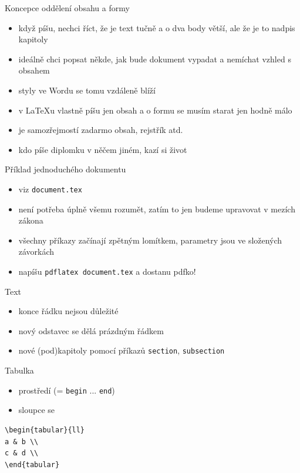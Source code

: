 \documentclass{beamer}
\begin{document}
\begin{frame}{Koncepce oddělení obsahu a formy}
  \begin{itemize}
    \item když píšu, nechci říct, že je text tučně a o dva body větší, ale že je to nadpis kapitoly
    \item ideálně chci popsat někde, jak bude dokument vypadat a nemíchat vzhled s obsahem
    \item styly ve Wordu se tomu vzdáleně blíží
    \item v LaTeXu vlastně píšu jen obsah a o formu se musím starat jen hodně málo
    \item je samozřejmostí zadarmo obsah, rejstřík atd.
    \item kdo píše diplomku v něčem jiném, kazí si život
  \end{itemize}
\end{frame}

\begin{frame}{Příklad jednoduchého dokumentu}
  \begin{itemize}
    \item viz \texttt{document.tex}
    \item není potřeba úplně všemu rozumět, zatím to jen budeme upravovat v mezích zákona
    \item všechny příkazy začínají zpětným lomítkem, parametry jsou ve složených závorkách
    \item napíšu \texttt{pdflatex document.tex} a dostanu pdfko!
  \end{itemize}
\end{frame}

\begin{frame}{Text}
  \begin{itemize}
    \item konce řádku nejsou důležité
    \item nový odstavec se dělá prázdným řádkem
    \item nové (pod)kapitoly pomocí příkazů \texttt{section}, \texttt{subsection}
  \end{itemize}
\end{frame}

\begin{frame}[fragile]{Tabulka}
  \begin{itemize}
    \item prostředí (= \texttt{begin} ... \texttt{end})
    \item sloupce se
  \end{itemize}
      \scriptsize
  \begin{verbatim}
\begin{tabular}{ll}
a & b \\
c & d \\
\end{tabular}
  \end{verbatim}

\end{frame}
\end{document}
